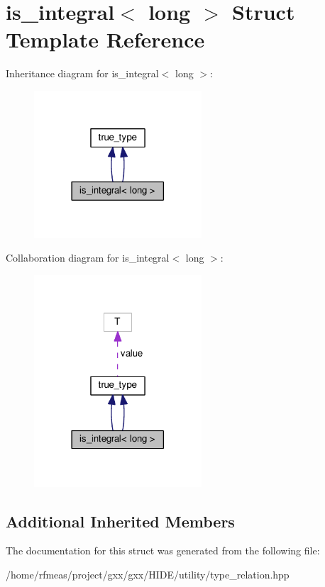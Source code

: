\hypertarget{structis__integral_3_01long_01_4}{}\section{is\+\_\+integral$<$ long $>$ Struct Template Reference}
\label{structis__integral_3_01long_01_4}


Inheritance diagram for is\+\_\+integral$<$ long $>$\+:
\nopagebreak
\begin{figure}[H]
\begin{center}
\leavevmode
\includegraphics[width=177pt]{structis__integral_3_01long_01_4__inherit__graph}
\end{center}
\end{figure}


Collaboration diagram for is\+\_\+integral$<$ long $>$\+:
\nopagebreak
\begin{figure}[H]
\begin{center}
\leavevmode
\includegraphics[width=177pt]{structis__integral_3_01long_01_4__coll__graph}
\end{center}
\end{figure}
\subsection*{Additional Inherited Members}


The documentation for this struct was generated from the following file\+:\begin{DoxyCompactItemize}
\item 
/home/rfmeas/project/gxx/gxx/\+H\+I\+D\+E/utility/type\+\_\+relation.\+hpp\end{DoxyCompactItemize}
